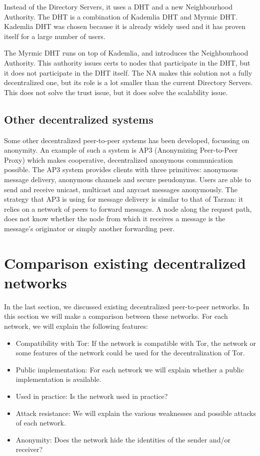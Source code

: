 \documentclass{article}
\begin{document}
		Instead of the Directory Servers, it uses a DHT and a new Neighbourhood Authority. The DHT is a combination of Kademlia DHT and Myrmic DHT. Kademlia DHT was chosen because it is already widely used and it has proven itself for a large number of users.
		
		The Myrmic DHT runs on top of Kademlia, and introduces the Neighbourhood Authority. This authority issues certs to nodes that participate in the DHT, but it does not participate in the DHT itself. The NA makes this solution not a fully decentralized one, but its role is a lot smaller than the current Directory Servers. This does not solve the trust issue, but it does solve the scalability issue.
		
	\subsection{Other decentralized systems}
		Some other decentralized peer-to-peer systems has been developed, focussing on anonymity. An example of such a system is AP3 (Anonymizing Peer-to-Peer Proxy) \cite{mislove2004ap3} which makes cooperative, decentralized anonymous communication possible. The AP3 system provides clients with three primitives: anonymous message delivery, anonymous channels and secure pseudonyms. Users are able to send and receive unicast, multicast and anycast messages anonymously. The strategy that AP3 is using for message delivery is similar to that of Tarzan: it relies on a network of peers to forward messages. A node along the request path, does not know whether the node from which it receives a message is the message's originator or simply another forwarding peer.

\section{Comparison existing decentralized networks}
	\label{sec:comparison}
	
	In the last section, we discussed existing decentralized peer-to-peer networks. In this section we will make a comparison between these networks. For each network, we will explain the following features:

	\begin{itemize}
		\item{Compatibility with Tor:} If the network is compatible with Tor, the network or some features of the network could be used for the decentralization of Tor.
		\item{Public implementation:} For each network we will explain whether a public implementation is available.
		\item{Used in practice:} Is the network used in practice?
		\item{Attack resistance:} We will explain the various weaknesses and possible attacks of each network.
		\item{Anonymity:} Does the network hide the identities of the sender and/or receiver?
	\end{itemize}
	
\end{document}
